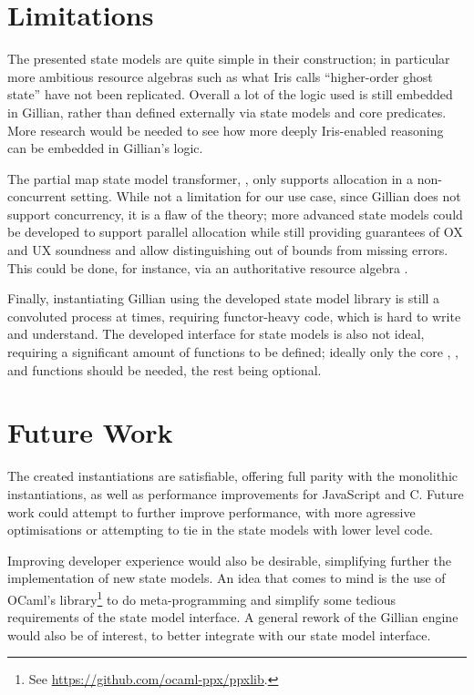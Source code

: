 \section{Limitations}

The presented state models are quite simple in their construction; in particular more ambitious resource algebras such as what Iris calls ``higher-order ghost state'' \cite{iris} have not been replicated. Overall a lot of the logic used is still embedded in Gillian, rather than defined externally via state models and core predicates. More research would be needed to see how more deeply Iris-enabled reasoning can be embedded in Gillian's logic.

The partial map state model transformer, \PMap, only supports allocation in a non-concurrent setting. While not a limitation for our use case, since Gillian does not support concurrency, it is a flaw of the theory; more advanced state models could be developed to support parallel allocation while still providing guarantees of OX and UX soundness and allow distinguishing out of bounds from missing errors. This could be done, for instance, via an authoritative resource algebra \cite{iris}.

Finally, instantiating Gillian using the developed state model library is still a convoluted process at times, requiring functor-heavy code, which is hard to write and understand. The developed interface for state models is also not ideal, requiring a significant amount of functions to be defined; ideally only the core \execac, \consume, \produce{} and \fix{} functions should be needed, the rest being optional.

\section{Future Work}

The created instantiations are satisfiable, offering full parity with the monolithic instantiations, as well as performance improvements for JavaScript and C. Future work could attempt to further improve performance, with more agressive optimisations or attempting to tie in the state models with lower level code. 

Improving developer experience would also be desirable, simplifying further the implementation of new state models. An idea that comes to mind is the use of OCaml's  library\footnote{See \url{https://github.com/ocaml-ppx/ppxlib}.} to do meta-programming and simplify some tedious requirements of the state model interface. A general rework of the Gillian engine would also be of interest, to better integrate with our state model interface.


